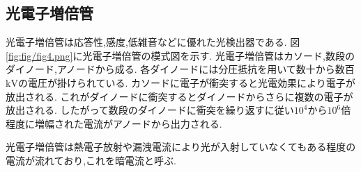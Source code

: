 \subsection{光電子増倍管\cite{UVTALKLE20:online}}
光電子増倍管は応答性,感度,低雑音などに優れた光検出器である.
図\ref{fig:fig/fig4.png}に光電子増倍管の模式図を示す.
光電子増倍管はカソード,数段のダイノード,アノードから成る.
各ダイノードには分圧抵抗を用いて数十から数百$\si{\kilo\volt}$の電圧が掛けられている.
カソードに電子が衝突すると光電効果により電子が放出される.
これがダイノードに衝突するとダイノードからさらに複数の電子が放出される.
したがって数段のダイノードに衝突を繰り返すに従い$10^4$から$10^6$倍程度に増幅された電流がアノードから出力される.

光電子増倍管は熱電子放射や漏洩電流により光が入射していなくてもある程度の電流が流れており,これを暗電流と呼ぶ.
